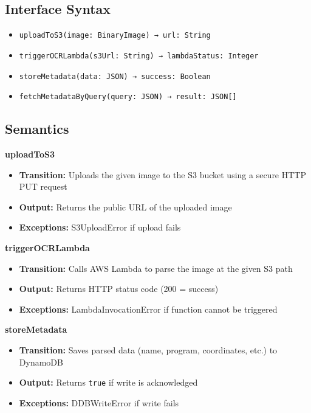 \documentclass[12pt, titlepage]{article}
\begin{document}
\subsection*{Interface Syntax}

\begin{itemize}
  \item \texttt{uploadToS3(image: BinaryImage) → url: String}
  \item \texttt{triggerOCRLambda(s3Url: String) → lambdaStatus: Integer}
  \item \texttt{storeMetadata(data: JSON) → success: Boolean}
  \item \texttt{fetchMetadataByQuery(query: JSON) → result: JSON[]}
\end{itemize}

\subsection*{Semantics}

\textbf{uploadToS3}
\begin{itemize}
  \item \textbf{Transition:} Uploads the given image to the S3 bucket using a secure HTTP PUT request
  \item \textbf{Output:} Returns the public URL of the uploaded image
  \item \textbf{Exceptions:} S3UploadError if upload fails
\end{itemize}

\textbf{triggerOCRLambda}
\begin{itemize}
  \item \textbf{Transition:} Calls AWS Lambda to parse the image at the given S3 path
  \item \textbf{Output:} Returns HTTP status code (200 = success)
  \item \textbf{Exceptions:} LambdaInvocationError if function cannot be triggered
\end{itemize}

\textbf{storeMetadata}
\begin{itemize}
  \item \textbf{Transition:} Saves parsed data (name, program, coordinates, etc.) to DynamoDB
  \item \textbf{Output:} Returns \texttt{true} if write is acknowledged
  \item \textbf{Exceptions:} DDBWriteError if write fails
\end{itemize}
\end{document}
